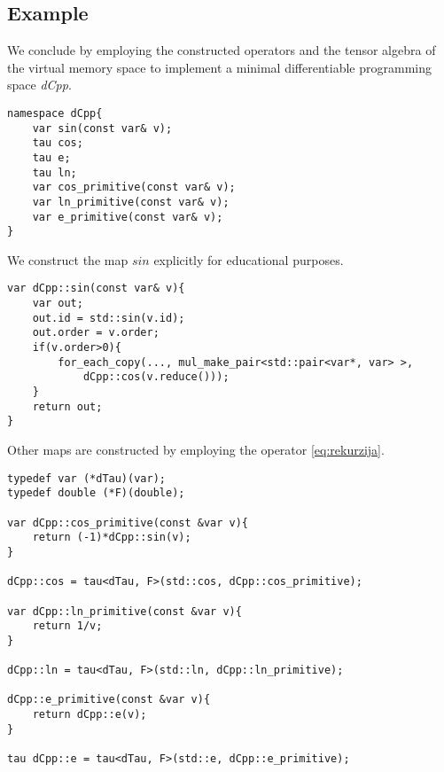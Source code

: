 \subsection{Example}

We conclude by employing the constructed operators and the tensor algebra of the virtual memory space to implement a minimal differentiable programming space \emph{dCpp}.

\begin{lstlisting}
namespace dCpp{
    var sin(const var& v);
    tau cos;
    tau e;
    tau ln;
    var cos_primitive(const var& v);
    var ln_primitive(const var& v);
    var e_primitive(const var& v);
}
\end{lstlisting}

\noindent We construct the map $sin$ explicitly for educational purposes.

\begin{lstlisting}
var dCpp::sin(const var& v){
    var out;
    out.id = std::sin(v.id);
    out.order = v.order;
    if(v.order>0){
    	for_each_copy(..., mul_make_pair<std::pair<var*, var> >,
    		dCpp::cos(v.reduce()));
    }
    return out;
}
\end{lstlisting}
Other maps are constructed by employing the operator \eqref{eq:rekurzija}.
\begin{lstlisting}
typedef var (*dTau)(var);
typedef double (*F)(double);

var dCpp::cos_primitive(const &var v){
    return (-1)*dCpp::sin(v);
}

dCpp::cos = tau<dTau, F>(std::cos, dCpp::cos_primitive);

var dCpp::ln_primitive(const &var v){
    return 1/v;
}

dCpp::ln = tau<dTau, F>(std::ln, dCpp::ln_primitive);

dCpp::e_primitive(const &var v){
    return dCpp::e(v);
}

tau dCpp::e = tau<dTau, F>(std::e, dCpp::e_primitive);

\end{lstlisting}
